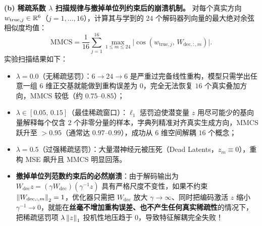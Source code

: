 \textbf{(b) 稀疏系数 $\lambda$ 扫描规律与撤掉单位列约束后的崩溃机制。}
对每个真实方向 $w_{\text{true}, j} \in \mathbb{R}^6$（$j=1,\dots,16$），计算其与学到的 $24$ 个解码器列向量的最大绝对余弦相似度均值：
\[
  \mathrm{MMCS} = \frac{1}{16}\sum_{j=1}^{16}\max_{1\le m\le 24} \big|\cos(w_{\text{true},j},\, W_{\text{dec},:,m})\big|.
\]
实验扫描结果如下：
\begin{itemize}
  \item $\lambda = 0.0$（无稀疏惩罚）：$6 \to 24 \to 6$ 是严重过完备线性重构，模型只需学出任意一组 $6$ 维正交基就能做到重构误差为 $0$，完全无法恢复 $16$ 个真实叠加方向，MMCS 较低（约 $0.75\text{--}0.85$）；
  \item $\lambda \in [0.05,\, 0.15]$（最佳稀疏窗口）：$\ell_1$ 惩罚迫使潜变量 $z$ 用尽可能少的基向量解释每个仅含 $2$ 个非零分量的样本，字典列精准对齐真实生成方向，MMCS 跃升至 $\mathbf{> 0.95}$（通常达 $0.97\text{--}0.99$），成功从 $6$ 维空间解耦 $16$ 个概念；
  \item $\lambda = 0.5$（过强稀疏惩罚）：大量潜神经元被压死（Dead Latents，$z_m \equiv 0$），重构 MSE 飙升且 MMCS 明显回落。
  \item \textbf{撤掉单位列范数约束后的必然崩溃}：由于解码输出为 $W_{\text{dec}} z = (\gamma W_{\text{dec}})(\gamma^{-1} z)$ 具有严格尺度不变性，如果不约束 $\left\|W_{\text{dec},:,m}\right\|_2 = 1$，优化器只需把 $W_{\text{dec}}$ 放大 $\gamma \to \infty$、同时把编码激活 $z$ 缩小 $\gamma^{-1} \to 0$，就能在\textbf{丝毫不增加重构误差、也不产生任何真实稀疏性}的情况下，把稀疏惩罚项 $\lambda\left\|z\right\|_1$ 投机性地压趋于 $0$，导致特征解耦完全失败！
\end{itemize}


